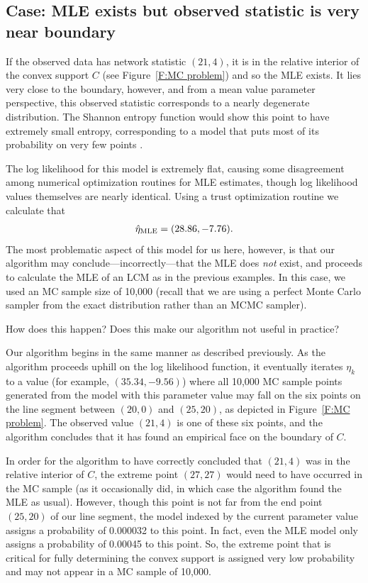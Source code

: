 \subsection{Case: MLE exists but observed statistic is very near boundary} 
\label{S:Example:9node problematic point}
If the observed data has network statistic $(21, 4)$, it is in the relative interior of 
the convex support $C$ (see Figure~\ref{F:MC problem}) and so the MLE exists.
It lies very close to the boundary, however, and from a mean value parameter 
perspective, this observed statistic 
corresponds to a nearly degenerate distribution. The Shannon entropy function would show this 
point to have extremely small entropy, corresponding to a model that puts most of its 
probability on very few points \citep{Rinaldo:2009}.

The log likelihood for this model is extremely flat, causing some disagreement among 
numerical optimization routines for MLE estimates, though log likelihood values 
themselves are nearly identical.  Using a trust optimization routine we calculate that 
\begin{align*}
\hat{\eta}_{\textrm{MLE}} = (28.86, -7.76).
\end{align*}
The most problematic aspect of this model for us here, however, is that our algorithm 
may conclude---incorrectly---that the MLE does \emph{not} exist, 
and proceeds to 
calculate the MLE of an LCM as in the previous examples.  In this case, we used
an MC sample size of 10,000 (recall that we are using a perfect Monte Carlo sampler
from the exact distribution rather than an MCMC sampler).

How does this happen?  Does this make our algorithm not useful in practice?

Our algorithm begins in the same manner as described previously.  As the algorithm 
proceeds uphill on the log likelihood function, it eventually iterates $\eta_k$ to a 
value (for example, $(35.34, -9.56)$) where all 10,000 MC sample points generated 
from the model with this parameter value may fall on the six points on the line segment 
between $(20,0)$ and $(25,20)$, as depicted in Figure~\ref{F:MC problem}.  
The observed value $(21,4)$ is one of these six points, and the algorithm concludes
that it has found an empirical face on the boundary of $C$.

In order for the algorithm to have correctly concluded that $(21,4)$ was in the 
relative interior of $C$, the extreme point $(27,27)$ 
would need to have occurred in the MC sample
(as it occasionally did, in which case the algorithm found the MLE as usual).  
However, though this point is not far from the end point $(25,20)$ of our line
segment, the model indexed by the current parameter value 
assigns a probability of 0.000032 to this point.  In fact, even the 
MLE model only assigns a probability of 0.00045 to this point.  
So, the extreme point that is critical for fully determining the convex support 
is assigned very low probability and may not appear in a MC sample of 10,000.

